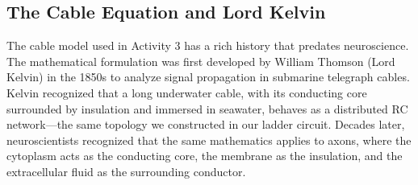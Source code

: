 \message{ !name(lab_report.tex)}\documentclass[12pt]{article}
\begin{document}
\subsection{The Cable Equation and Lord Kelvin}

The cable model used in Activity 3 has a rich history that predates neuroscience. The mathematical formulation was first developed by William Thomson (Lord Kelvin) in the 1850s to analyze signal propagation in submarine telegraph cables. Kelvin recognized that a long underwater cable, with its conducting core surrounded by insulation and immersed in seawater, behaves as a distributed RC network---the same topology we constructed in our ladder circuit. Decades later, neuroscientists recognized that the same mathematics applies to axons, where the cytoplasm acts as the conducting core, the membrane as the insulation, and the extracellular fluid as the surrounding conductor.
\end{document}
